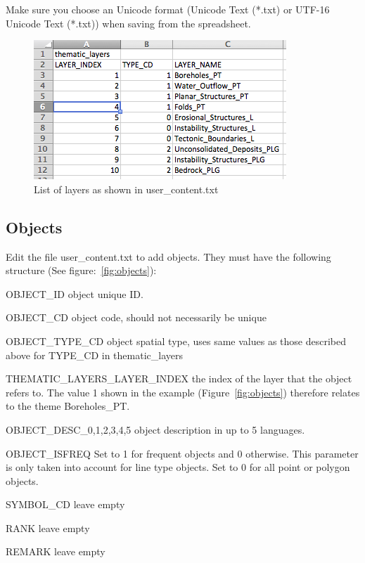 \documentclass[a4paper, 12pt]{article}
\begin{document}
Make sure you choose an Unicode format (Unicode Text (*.txt) or UTF-16 Unicode Text (*.txt)) when saving from the spreadsheet.

\begin{figure} [hbp]
  \centering
  \includegraphics[width=.6\textwidth]{img/layers.png}
  \caption{List of layers as shown in user\_content.txt}
  \label{fig:layers}
\end{figure}

\subsection{Objects}
\label{sec:objects}

Edit the file user\_content.txt to add objects. They must have the following structure (See figure:~\ref{fig:objects}):
\begin{description*}
  \item [OBJECT\_ID] object unique ID.
  \item [OBJECT\_CD] object code, should not necessarily be unique
  \item [OBJECT\_TYPE\_CD] object spatial type, uses same values as those described above for TYPE\_CD in thematic\_layers
  \item [THEMATIC\_LAYERS\_LAYER\_INDEX] the index of the layer that the object refers to. The value 1 shown in the example (Figure~\ref{fig:objects}) therefore relates to the theme Boreholes\_PT.
  \item [OBJECT\_DESC\_0,1,2,3,4,5] object description in up to 5 languages.
  \item [OBJECT\_ISFREQ] Set to 1 for frequent objects and 0 otherwise. This parameter is only taken into account for line type objects. Set to 0 for all point or polygon objects.
  \item [SYMBOL\_CD] leave empty
  \item [RANK] leave empty
  \item [REMARK] leave empty
\end{description*}
\end{document}
